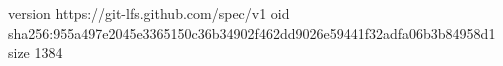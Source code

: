 version https://git-lfs.github.com/spec/v1
oid sha256:955a497e2045e3365150c36b34902f462dd9026e59441f32adfa06b3b84958d1
size 1384

